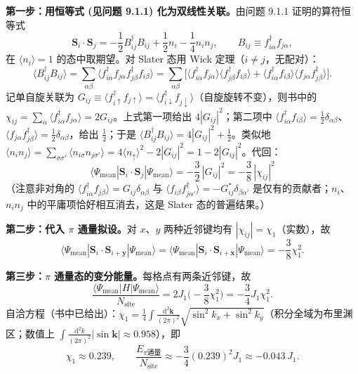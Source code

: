\textbf{第一步：用恒等式 (见问题 9.1.1) 化为双线性关联。}由问题 9.1.1 证明的算符恒等式
\begin{equation*}
\pmb{S}_i\cdot\pmb{S}_j=-\frac12 B^{\dagger}_{ij}B_{ij}+\frac12 n_i-\frac14 n_in_j,
\qquad B_{ij}\equiv f^{\dagger}_{i\alpha}f_{j\alpha},
\end{equation*}
在 $\langle n_i\rangle=1$ 的态中取期望。对 Slater 态用 Wick 定理（$i\neq j$，无配对）：
\begin{equation*}
\langle B^{\dagger}_{ij}B_{ij}\rangle
=\sum_{\alpha\beta}\langle f^{\dagger}_{i\alpha}f_{j\alpha}f^{\dagger}_{j\beta}f_{i\beta}\rangle
=\sum_{\alpha\beta}\Big[\langle f^{\dagger}_{i\alpha}f_{j\alpha}\rangle\langle f^{\dagger}_{j\beta}f_{i\beta}\rangle
+\langle f^{\dagger}_{i\alpha}f_{i\beta}\rangle\langle f_{j\alpha}f^{\dagger}_{j\beta}\rangle\Big].
\end{equation*}
记单自旋关联为 $G_{ij}\equiv\langle f^{\dagger}_{i\uparrow}f_{j\uparrow}\rangle=\langle f^{\dagger}_{i\downarrow}f_{j\downarrow}\rangle$（自旋旋转不变），则书中的 $\chi_{ij}=\sum_\alpha\langle f^{\dagger}_{i\alpha}f_{j\alpha}\rangle=2G_{ij}$。上式第一项给出 $4|G_{ij}|^2$；第二项中 $\langle f^{\dagger}_{i\alpha}f_{i\beta}\rangle=\frac12\delta_{\alpha\beta}$、$\langle f_{j\alpha}f^{\dagger}_{j\beta}\rangle=\frac12\delta_{\alpha\beta}$，给出 $\frac12$；于是 $\langle B^{\dagger}_{ij}B_{ij}\rangle=4|G_{ij}|^2+\frac12$。类似地 $\langle n_in_j\rangle=\sum_{\sigma\sigma'}\langle n_{i\sigma}n_{j\sigma'}\rangle=4\langle n_{\uparrow}\rangle^2-2|G_{ij}|^2=1-2|G_{ij}|^2$。代回：
\begin{equation*}
\boxed{\;\langle\Psi_{\text{mean}}|\pmb{S}_i\cdot\pmb{S}_j|\Psi_{\text{mean}}\rangle
=-\frac32\,|G_{ij}|^2=-\frac38\,|\chi_{ij}|^2\;}
\end{equation*}
（注意非对角的 $\langle f^{\dagger}_{i\alpha}f_{j\beta}\rangle=G_{ij}\delta_{\alpha\beta}$ 与 $\langle f_{i\beta}f^{\dagger}_{j\alpha'}\rangle=-G^*_{ij}\delta_{\beta\alpha'}$ 是仅有的贡献者；$n_i$、$n_in_j$ 中的平庸项恰好相互消去，这是 Slater 态的普遍结果。）

\textbf{第二步：代入 $\pi$ 通量拟设。}对 $x$、$y$ 两种近邻键均有 $|\chi_{ij}|=\chi_1$（实数），故
\begin{equation*}
\langle\Psi_{\text{mean}}|\pmb{S}_i\cdot\pmb{S}_{i+\pmb{y}}|\Psi_{\text{mean}}\rangle
=\langle\Psi_{\text{mean}}|\pmb{S}_i\cdot\pmb{S}_{i+\pmb{x}}|\Psi_{\text{mean}}\rangle
=-\frac38\chi_1^2 .
\end{equation*}

\textbf{第三步：$\pi$ 通量态的变分能量。}每格点有两条近邻键，故
\begin{equation*}
\frac{\langle\Psi_{\text{mean}}|H|\Psi_{\text{mean}}\rangle}{N_{\text{site}}}
=2J_1\Big(-\frac38\chi_1^2\Big)=-\frac34J_1\chi_1^2 .
\end{equation*}
自洽方程（书中已给出）：$\chi_1=\frac14\int\frac{\mathrm{d}^2\pmb{k}}{(2\pi)^2}\sqrt{\sin^2k_x+\sin^2k_y}$（积分全域为布里渊区；数值上 $\int\frac{\mathrm{d}^2k}{(2\pi)^2}|\sin\pmb{k}|\approx0.958$），即
\begin{equation*}
\chi_1\approx0.239,\qquad
\frac{E_{\pi\text{通量}}}{N_{\text{site}}}\approx-\frac34(0.239)^2J_1\approx-0.043\,J_1 .
\end{equation*}

